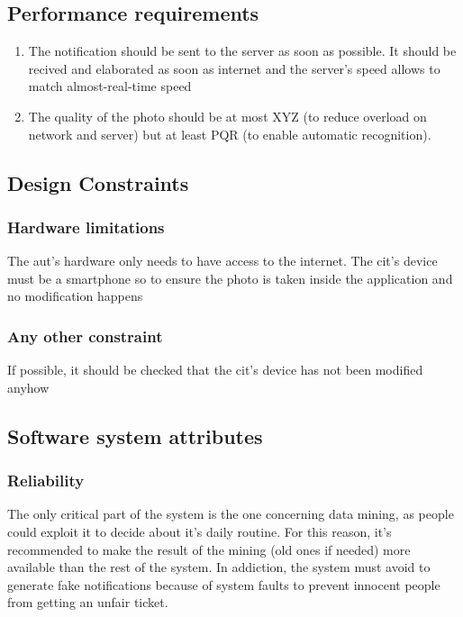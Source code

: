 \documentclass{article}
\begin{document}
	\subsection{Performance requirements}
		\begin{enumerate}
			\item The notification should be sent to the server as soon as possible. It should be recived and elaborated as soon as internet and the server's speed allows to match almost-real-time speed
			\item The quality of the photo should be at most XYZ (to reduce overload on network and server) but at least PQR (to enable automatic recognition).
		\end{enumerate}
		
	\subsection{Design Constraints}
	
		\subsubsection{Hardware limitations} The aut's hardware only needs to have access to the internet. The cit's device must be a smartphone so to ensure the photo is taken inside the application and no modification happens
		
		\subsubsection{Any other constraint} If possible, it should be checked that the cit's device has not been modified anyhow
		
	\subsection{Software system attributes}
	
		\subsubsection{Reliability}
			The only critical part of the system is the one concerning data mining, as people could exploit it to decide about it's daily routine. For this reason, it's recommended to make the result of the mining (old ones if needed) more available than the rest of the system.
			In addiction, the system must avoid to generate fake notifications because of system faults to prevent innocent people from getting an unfair ticket.
			
\end{document}
